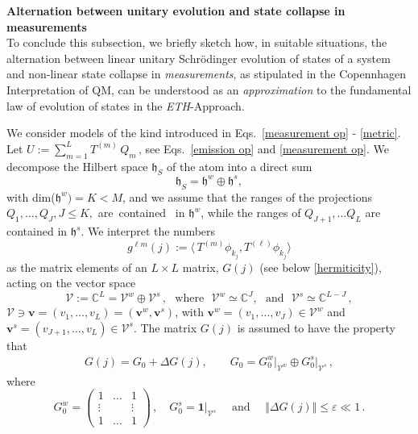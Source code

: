 \documentclass[12pt]{article}
\begin{document}
{{\bf{Alternation between unitary evolution and state collapse in measurements}}\\

To conclude this subsection, we briefly sketch how, in suitable situations, the alternation between linear unitary
Schr\"odinger evolution of states of a system and non-linear state collapse
 in \textit{measurements}, as stipulated in the Copennhagen Interpretation of QM, can be understood as
 an \textit{approximation} to the fundamental law of evolution of states in the \textit{ETH}-Approach.

We consider models of the kind introduced in Eqs.~\eqref{measurement op} - \eqref{metric}.
 Let $U:= \sum_{m=1}^{L} T^{(m)}\,Q_{m}$\,, see  Eqs.~\eqref{emission op} and \eqref{measurement op}.
We decompose the Hilbert space $\mathfrak{h}_S$ of the atom into a direct sum
\begin{equation}\label{dec}
\mathfrak{h}_S = \mathfrak{h}^{w} \oplus \mathfrak{h}^{s},
\end{equation}
with dim($\mathfrak{h}^{w}) = K < M$, and we assume that the ranges of the projections $Q_1, \dots, Q_J, J\leq K,$
\mbox{are contained } in $\mathfrak{h}^{w}$, while the ranges of $Q_{J+1}, \dots Q_L$ are contained in $\mathfrak{h}^{s}$.
We interpret the numbers
$$g^{\ell m}(j):=  \langle \,T^{(m)}\phi_{k_j}, T^{(\ell)} \phi_{k_j}\rangle$$
as the matrix elements of an $L\times L$ matrix, $G(j)$ (see below \eqref{hermiticity}), acting on the vector space
$$\mathcal{V}:=\mathbb{C}^{L}= \mathcal{V}^{w} \oplus \mathcal{V}^{s}\,,\,\, \text{ where }\,\, \mathcal{V}^{w}\simeq
\mathbb{C}^{J},\,\, \text{ and }\,\, \mathcal{V}^{s}\simeq \mathbb{C}^{L-J}\,,$$
$\mathcal{V} \ni \mathbf{v}=(v_1,\dots, v_L) = (\mathbf{v}^{w}, \mathbf{v}^{s})$, with
$\mathbf{v}^{w}=(v_1, \dots, v_J)\in \mathcal{V}^{w}$ and $\mathbf{v}^{s}=(v_{J+1}, \dots, v_{L})\in \mathcal{V}^{s}$.
The matrix $G(j)$ is assumed to have the property that
\begin{align}\label{metric ex}
G(j) = G_{0} + \Delta G(j), \qquad G_{0}= G_{0}^{w}\vert_{\mathcal{V}^{w}} \oplus G_{0}^{s}\vert_{\mathcal{V}^{s}}\,,
\end{align}
where
\begin{equation}\label{matrices}
G_{0}^{w} = \begin{pmatrix} 1& \hdots & 1\\ \vdots & & \vdots \\ 1& \hdots &1 \end{pmatrix}\,, \quad
G_{0}^{s} = \mathbf{1}\vert_{\mathcal{V}^{s}}\quad \text{  and  }\quad \Vert \Delta G(j) \Vert \leq \varepsilon \ll 1\,.

\end{equation}}
\end{document}
